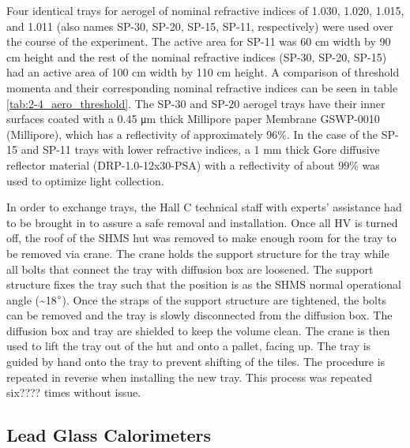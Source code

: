 \documentclass[
]{report}
\begin{document}


Four identical trays for aerogel of nominal refractive indices of 1.030,
1.020, 1.015, and 1.011 (also names SP-30, SP-20, SP-15, SP-11,
respectively) were used over the course of the experiment. The active
area for SP-11 was 60 cm width by 90 cm height and the rest of the
nominal refractive indices (SP-30, SP-20, SP-15) had an active area of
100 cm width by 110 cm height. A comparison of threshold momenta and
their corresponding nominal refractive indices can be seen in table
\ref{tab:2-4_aero_threshold}. The SP-30 and SP-20 aerogel trays have
their inner surfaces coated with a 0.45 μm thick Millipore paper
Membrane GSWP-0010 (Millipore), which has a reflectivity of
approximately 96\%. In the case of the SP-15 and SP-11 trays with lower
refractive indices, a 1 mm thick Gore diffusive reflector material
(DRP-1.0-12x30-PSA) with a reflectivity of about 99\% was used to
optimize light collection.



In order to exchange trays, the Hall C technical staff with experts'
assistance had to be brought in to assure a safe removal and
installation. Once all HV is turned off, the roof of the SHMS hut was
removed to make enough room for the tray to be removed via crane. The
crane holds the support structure for the tray while all bolts that
connect the tray with diffusion box are loosened. The support structure
fixes the tray such that the position is as the SHMS normal operational
angle (\textasciitilde18\(\degree\)). Once the straps of the support
structure are tightened, the bolts can be removed and the tray is slowly
disconnected from the diffusion box. The diffusion box and tray are
shielded to keep the volume clean. The crane is then used to lift the
tray out of the hut and onto a pallet, facing up. The tray is guided by
hand onto the tray to prevent shifting of the tiles. The procedure is
repeated in reverse when installing the new tray. This process was
repeated six???? times without issue.

\hypertarget{lead-glass-calorimeters}{%
\subsection{\texorpdfstring{Lead Glass Calorimeters
\label{Chapter-4-5-4}}{Lead Glass Calorimeters }}\label{lead-glass-calorimeters}}
\end{document}
